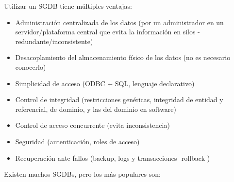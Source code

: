 \documentclass[
]{book}
\providecommand{\tightlist}{%
  \setlength{\itemsep}{0pt}\setlength{\parskip}{0pt}}
\begin{document}
Utilizar un SGDB tiene múltiples ventajas:

\begin{itemize}
\tightlist
\item
  Administración centralizada de los datos (por un administrador en un servidor/plataforma central que evita la información en silos -redundante/inconsistente)
\item
  Desacoplamiento del almacenamiento físico de los datos (no es necesario conocerlo)
\item
  Simplicidad de acceso (ODBC + SQL, lenguaje declarativo)
\item
  Control de integridad (restricciones genéricas, integridad de entidad y referencial, de dominio, y las del dominio en software)
\item
  Control de acceso concurrente (evita inconsistencia)
\item
  Seguridad (autenticación, roles de acceso)
\item
  Recuperación ante fallos (backup, logs y transacciones -rollback-)
\end{itemize}

Existen muchos SGDBs, pero los más populares son:
\end{document}
